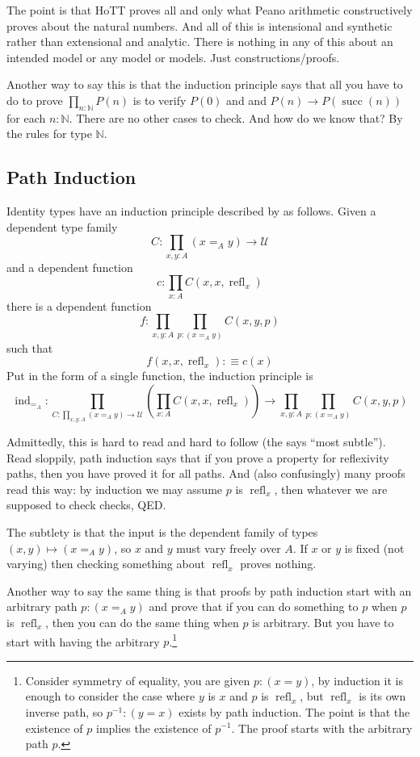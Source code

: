 \documentclass[11pt]{article}
\DeclareMathOperator{\refl}{refl}
\DeclareMathOperator{\successor}{succ}
\DeclareMathOperator{\inductor}{ind}
\newcommand{\nats}{\mathbb{N}}
\newcommand{\universe}{\mathcal{U}}
\begin{document}
The point is that HoTT proves all and only what Peano arithmetic constructively
proves
about the natural numbers.  And all of this is intensional and synthetic
rather than extensional and analytic.  There is nothing in any of this
about an intended model or any model or models.  Just constructions/proofs.

Another way to say this is that the induction principle says that all you
have to do to prove $\prod_{n : \nats} P(n)$ is to verify $P(0)$ and
and $P(n) \to P(\successor(n))$ for each $n : \nats$.
There are no other cases to check.
And how do we know that?  By the rules for type $\nats$.

\subsection{Path Induction}
\label{sec:path-induction}

Identity types have an induction principle
described by  as follows.
Given a dependent type family
$$
   C : \prod_{x, y : A} (x =_A y) \to \universe
$$
and a dependent function
$$
   c : \prod_{x : A} C(x, x, \refl_x)
$$
there is a dependent function
$$
   f : \prod_{x, y : A} \prod_{p : (x =_A y)} C(x, y, p)
$$
such that
$$
   f(x, x, \refl_x) :\equiv c(x)
$$
Put in the form of a single function, the induction principle is
$$
   \inductor_{=_A} :
   \prod_{C : \prod_{x, y : A} (x =_A y) \to \universe}
   \left( \prod_{x : A} C(x, x, \refl_x) \right)
   \to
   \prod_{x, y : A} \prod_{p : (x =_A y)} C(x, y, p)
$$

Admittedly, this is hard to read and hard to follow
(the  says ``most subtle'').
Read sloppily, path induction says that if you prove a property for
reflexivity paths, then you have proved it for all paths.
And (also confusingly) many proofs read this way: by induction we may
assume $p$ is $\refl_x$, then whatever we are supposed to check checks,
QED.

The subtlety  is that
the input is the dependent family of types $(x, y) \mapsto (x =_A y)$,
so $x$ and $y$ must vary freely over $A$.
If $x$ or $y$ is fixed (not varying) then checking something about $\refl_x$
proves nothing.

Another way to say the same thing is that proofs by path induction start
with an arbitrary path $p : (x =_A y)$ and prove that if you can do something
to $p$ when $p$ is $\refl_x$, then you can do the same thing when $p$ is
arbitrary.  But you have to start with having
the arbitrary $p$.\footnote{Consider symmetry of equality, you are given
$p : (x = y)$, by induction it is enough to consider the case where $y$ is
$x$ and $p$ is $\refl_x$, but $\refl_x$ is its own inverse path,
so $p^{-1} : (y = x)$ exists by path induction.  The point is that the
existence of $p$ implies the existence of $p^{-1}$.  The proof starts with
the arbitrary path $p$.}
\end{document}
